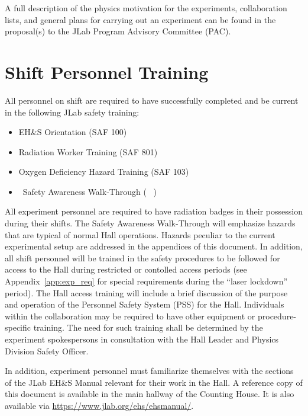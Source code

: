 \documentclass[10pt]{article}
\begin{document}
A full description of the physics motivation for the experiments, collaboration
lists, and general plans for carrying out an experiment can be found in the
proposal(s) to the JLab Program Advisory Committee (PAC).

\section{Shift Personnel Training}

All personnel on shift are required to have successfully completed and be
current in the following JLab safety training:

\begin{itemize}

\item EH\&S Orientation (SAF 100)

\item Radiation Worker Training (SAF 801)

\item Oxygen Deficiency Hazard Training (SAF 103)

\item \HALL\ Safety Awareness Walk-Through ( \AWARENESS\ )

\end{itemize}

 All experiment personnel are
required to have radiation badges in their possession during their shifts.
The Safety Awareness Walk-Through will
emphasize hazards that are typical of normal Hall operations.
Hazards  peculiar to the current experimental setup are addressed in the appendices
of this document.
In addition, all shift personnel will be trained in the safety procedures to be
followed for access to the Hall
during restricted or contolled access
periods (see Appendix~\ref{app:exp_req} for special requirements during 
the ``laser lockdown'' period).
The Hall access
training will include a brief discussion of the purpose and operation of the
Personnel Safety System (PSS) for the Hall.
Individuals within the collaboration may be required to have other equipment
or procedure-specific training. The need for such
training shall be determined by the experiment spokespersons in consultation
with the Hall Leader and Physics Division Safety Officer.

In addition, experiment personnel must familiarize themselves with the
sections of the JLab EH\&S Manual relevant for their work in the Hall.
A reference copy of this
document is available in the main hallway of the Counting House. It is also
available via \url{https://www.jlab.org/ehs/ehsmanual/}.
\end{document}

